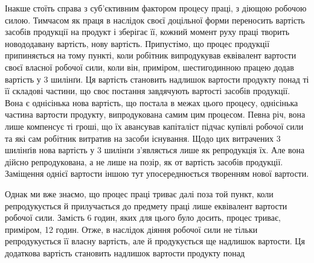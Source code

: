 Інакше стоїть справа з суб’єктивним фактором процесу праці,
з діющою робочою силою. Тимчасом як праця в наслідок своєї
доцільної форми переносить вартість засобів продукції на продукт
і зберігає її, кожний момент руху праці творить новододавану вартість,
нову вартість. Припустімо, що процес продукції припиняється
на тому пункті, коли робітник випродукував еквівалент
вартости своєї власної робочої сили, коли він, приміром, шестигодинною
працею додав вартість у 3 шилінґи. Ця вартість становить
надлишок вартости продукту понад ті її складові частини,
що своє постання завдячують вартості засобів продукції. Вона є
однісінька нова вартість, що постала в межах цього процесу,
однісінька частина вартости продукту, випродукована самим цим
процесом. Певна річ, вона лише компенсує ті гроші, що їх авансував
капіталіст підчас купівлі робочої сили та які сам робітник
витратив на засоби існування. Щодо цих витрачених 3 шилінґів
нова вартість у 3 шилінґи з’являється лише як репродукція їх.
Але вона дійсно репродукована, а не лише на позір, як от вартість
засобів продукції. Заміщення однієї вартости іншою тут упосереднюється
творенням нової вартости.

Однак ми вже знаємо, що процес праці триває далі поза той
пункт, коли репродукується й прилучається до предмету праці
лише еквівалент вартости робочої сили. Замість 6 годин, яких
для цього було досить, процес триває, приміром, 12 годин. Отже,
в наслідок діяння робочої сили не тільки репродукується її власну
вартість, але й продукується ще надлишок вартости. Ця додаткова
вартість становить надлишок вартости продукту понад
\parbreak{}  %
